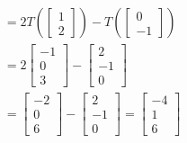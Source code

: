 \documentclass{ximera}
\begin{document}
\begin{example}
\begin{explanation}
\begin{align*}
    &=2T\left(\begin{bmatrix}1\\2\end{bmatrix}\right)-T\left(\begin{bmatrix}0\\-1\end{bmatrix}\right)\\
    &=2\begin{bmatrix}-1\\0\\3\end{bmatrix}-\begin{bmatrix}2\\-1\\0\end{bmatrix}\\
    &=\begin{bmatrix}-2\\0\\6\end{bmatrix}-\begin{bmatrix}2\\-1\\0\end{bmatrix}=\begin{bmatrix}-4\\1\\6\end{bmatrix}
\end{align*}


\end{explanation}
\end{example}
\end{document}
